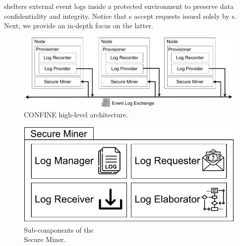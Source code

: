 shelters external event logs inside a protected environment to preserve data confidentiality and integrity.
Notice that s accept requests issued solely by s. 
Next, we provide an in-depth focus on the latter.

\begin{figure}[t]
	\centering
	\includegraphics[width=0.79\linewidth]{content/figures/architecturediagram.pdf}
	\caption{CONFINE high-level architecture.}
	\label{fig:architecture_diagram}
\end{figure}

\begin{figure}
	\vspace{-2em}
	\centering
	\includegraphics[width=1\textwidth]{content/figures/secureminersad.pdf}
	\caption[A gull]{Sub-components of the \\Secure Miner.}
	\label{fig:trusted_miner}
	\vspace{-6pt}
\end{figure} 
